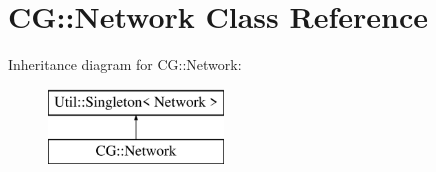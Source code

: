 \hypertarget{class_c_g_1_1_network}{}\section{CG\+:\+:Network Class Reference}
\label{class_c_g_1_1_network}
Inheritance diagram for CG\+:\+:Network\+:\begin{figure}[H]
\begin{center}
\leavevmode
\includegraphics[height=2.000000cm]{class_c_g_1_1_network}
\end{center}
\end{figure}
